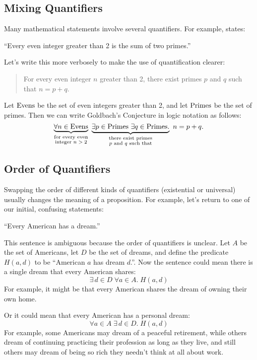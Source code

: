 \subsection{Mixing Quantifiers}

Many mathematical statements involve several quantifiers.  For
example,  states:
%
\begin{center}
``Every even integer greater than 2 is the sum of two primes.''
\end{center}
%
Let's write this more verbosely to make the use of quantification
clearer:
%
\begin{quote}
For every even integer $n$ greater than 2,
there exist primes $p$ and $q$ such that $n = p + q$.
\end{quote}
%
Let $\text{Evens}$ be the set of even integers greater than 2, and let $\text{Primes}$ be the
set of primes.  Then we can write Goldbach's Conjecture in logic
notation as follows:
%
\[
\underbrace{\forall n \in \text{Evens}}_{\substack
    {\text{for every even} \\
     \text{integer $n > 2$}}}
\
\underbrace{\exists p \in \text{Primes}\ \exists q \in \text{Primes}.}_{\substack
    {\text{there exist primes} \\
     \text{$p$ and $q$ such that}}}
\ n = p + q.
\]

\subsection{Order of Quantifiers}

Swapping the order of different kinds of quantifiers (existential or
universal) usually changes the meaning of a proposition.  For example,
let's return to one of our initial, confusing statements:
\begin{center}
``Every American has a dream.''
\end{center}

This sentence is ambiguous because the order of quantifiers is
unclear.  Let $A$ be the set of Americans, let $D$ be the set of
dreams, and define the predicate $H(a, d)$ to be ``American $a$ has
dream $d$.''.  Now the sentence could mean there is a single dream
that every American shares:
\[
\exists\, d \in D\; \forall a \in A.\; H(a, d)
\]
For example, it might be that every American shares the dream of owning
their own home.

Or it could mean that every American has a personal dream:
\[
\forall a \in A\; \exists\, d \in D.\; H(a, d)
\]
For example, some Americans may dream of a peaceful retirement, while
others dream of continuing practicing their profession as long as they
live, and still others may dream of being so rich they needn't think at
all about work.

